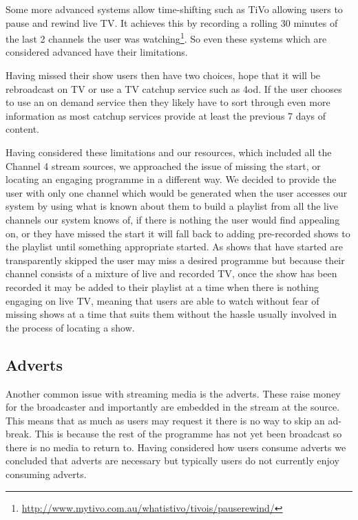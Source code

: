 Some more advanced systems allow time-shifting such as TiVo allowing users to pause and rewind live TV. It achieves this by recording a rolling 30 minutes of the last 2 channels the user was watching\footnote{\url{http://www.mytivo.com.au/whatistivo/tivois/pauserewind/}}. So even these systems which are considered advanced have their limitations.

Having missed their show users then have two choices, hope that it will be rebroadcast on TV or use a TV catchup service such as 4od. If the user chooses to use an on demand service then they likely have to sort through even more information as most catchup services provide at least the previous 7 days of content.

Having considered these limitations and our resources, which included all the Channel 4 stream sources, we approached the issue of missing the start, or locating an engaging programme in a different way. We decided to provide the user with only one channel which would be generated when the user accesses our system by using what is known about them to build a playlist from all the live channels our system knows of, if there is nothing the user would find appealing on, or they have missed the start it will fall back to adding pre-recorded shows to the playlist until something appropriate started. As shows that have started are transparently skipped the user may miss a desired programme but because their channel consists of a mixture of live and recorded TV, once the show has been recorded it may be added to their playlist at a time when there is nothing engaging on live TV, meaning that users are able to watch without fear of missing shows at a time that suits them without the hassle usually involved in the process of locating a show.

\subsection{Adverts}
Another common issue with streaming media is the adverts. These raise money for the broadcaster and importantly are embedded in the stream at the source. This means that as much as users may request it there is no way to skip an ad-break. This is because the rest of the programme has not yet been broadcast so there is no media to return to. Having considered how users consume adverts we concluded that adverts are necessary but typically users do not currently enjoy consuming adverts.

